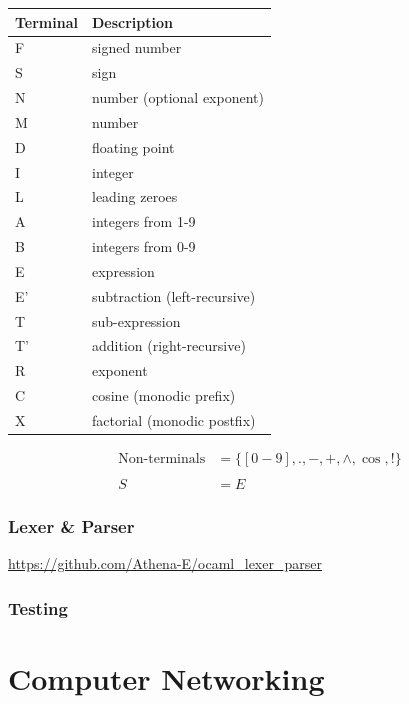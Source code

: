\documentclass[a4paper, 12pt, oneside]{book}
\begin{document}
\begin{center}
  \begin{tabular}{|l|l|}
    \hline
    \textbf{Terminal} & \textbf{Description}         \\
    \hline
    F                 & signed number                \\
    \hline
    S                 & sign                         \\
    \hline
    N                 & number (optional exponent)   \\
    \hline
    M                 & number                       \\
    \hline
    D                 & floating point               \\
    \hline
    I                 & integer                      \\
    \hline
    L                 & leading zeroes               \\
    \hline
    A                 & integers from 1-9            \\
    \hline
    B                 & integers from 0-9            \\
    \hline
    E                 & expression                   \\
    \hline
    E'                & subtraction (left-recursive) \\
    \hline
    T                 & sub-expression               \\
    \hline
    T'                & addition (right-recursive)   \\
    \hline
    R                 & exponent                     \\
    \hline
    C                 & cosine (monodic prefix)      \\
    \hline
    X                 & factorial (monodic postfix)  \\
    \hline
  \end{tabular}
\end{center}

\begin{align*}
  \text{Non-terminals} & = \{[0-9],., -, +, \wedge, \cos, !\} \\
  \\
  S                    & = E
\end{align*}

\subsection{Lexer \& Parser}

\url{https://github.com/Athena-E/ocaml_lexer_parser}

\subsection{Testing}


\chapter{Computer Networking}
\end{document}
